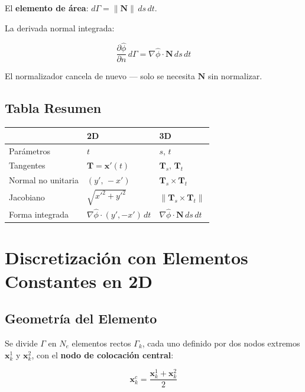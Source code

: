 \documentclass[12pt,a4paper]{article}
\begin{document}
El \textbf{elemento de área}: $d\Gamma = \|\mathbf{N}\|\,ds\,dt$.

La derivada normal integrada:

\begin{equation}
    \frac{\partial\hat{\phi}}{\partial n}\,d\Gamma
    = \nabla\hat{\phi}\cdot\mathbf{N}\,ds\,dt
\end{equation}

El normalizador cancela de nuevo — solo se necesita $\mathbf{N}$ sin normalizar.

\subsection{Tabla Resumen}

\begin{center}
\begin{tabular}{lll}
\toprule
 & 2D & 3D \\
\midrule
Parámetros & $t$ & $s,\,t$ \\
Tangentes & $\mathbf{T} = \mathbf{x}'(t)$ & $\mathbf{T}_s,\,\mathbf{T}_t$ \\
Normal no unitaria & $(y',\,-x')$ & $\mathbf{T}_s\times\mathbf{T}_t$ \\
Jacobiano & $\sqrt{x'^2+y'^2}$ & $\|\mathbf{T}_s\times\mathbf{T}_t\|$ \\
Forma integrada & $\nabla\hat{\phi}\cdot(y',-x')\,dt$
    & $\nabla\hat{\phi}\cdot\mathbf{N}\,ds\,dt$ \\
\bottomrule
\end{tabular}
\end{center}

\section{Discretización con Elementos Constantes en 2D}

\subsection{Geometría del Elemento}

Se divide $\Gamma$ en $N_e$ elementos rectos $\Gamma_k$, cada uno definido por
dos nodos extremos $\mathbf{x}_k^1$ y $\mathbf{x}_k^2$, con el
\textbf{nodo de colocación central}:

\begin{equation}
    \mathbf{x}_k^c = \frac{\mathbf{x}_k^1 + \mathbf{x}_k^2}{2}
\end{equation}
\end{document}
